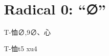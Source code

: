 
\section*{Radical 0: ``∅''}

\begin{entry}{T-恤}{∅,9}{∅、⼼}
  \begin{phonetics}{T-恤}{t5 xu4}
  \end{phonetics}
\end{entry}


